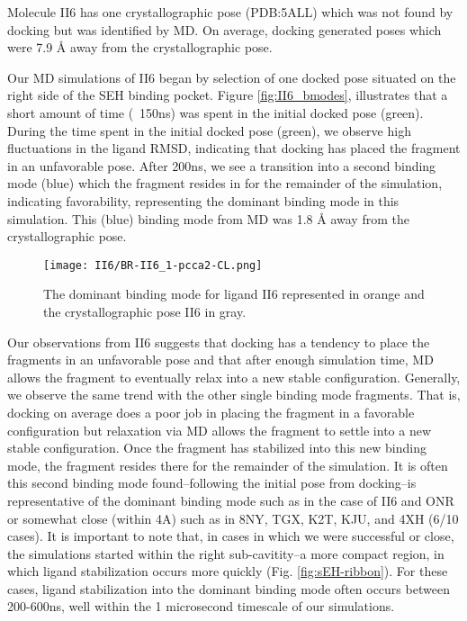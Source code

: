 \documentclass[journal=jcisd8,manuscript=article]{achemso}
\begin{document}
Molecule II6 has one crystallographic pose (PDB:5ALL) which was not found by docking but was identified by MD.
On average, docking generated poses which were 7.9 {\AA} away from the crystallographic pose.

Our MD simulations of II6 began by selection of one docked pose situated on the right side of the SEH binding pocket.
Figure \ref{fig:II6_bmodes}, illustrates that a short amount of time (~150ns) was spent in the initial docked pose (green).
During the time spent in the initial docked pose (green), we observe high fluctuations in the ligand RMSD, indicating that docking has placed the fragment in an unfavorable pose.
After 200ns, we see a transition into a second binding mode (blue) which the fragment resides in for the remainder of the simulation, indicating favorability, representing the dominant binding mode in this simulation.
This (blue) binding mode from MD was 1.8 {\AA} away from the crystallographic pose. 

\begin{figure}
    \centering
    \texttt{[image: II6/BR-II6\_1-pcca2-CL.png]}
    \caption[Ligand II6 with crystal structure]{The dominant binding mode for ligand II6 represented in orange and the crystallographic pose II6 in gray.}
    \label{fig:II6_pcca2}
\end{figure}

Our observations from II6 suggests that docking has a tendency to place the fragments in an unfavorable pose and that after enough simulation time, MD allows the fragment to eventually relax into a new stable configuration.
Generally, we observe the same trend with the other single binding mode fragments.
That is, docking on average does a poor job in placing the fragment in a favorable configuration but relaxation via MD allows the fragment to settle into a new stable configuration.
Once the fragment has stabilized into this new binding mode, the fragment resides there for the remainder of the simulation.
It is often this second binding mode found--following the initial pose from docking--is representative of the dominant binding mode such as in the case of II6 and ONR or somewhat close (within 4A) such as in 8NY, TGX, K2T, KJU, and 4XH (6/10 cases).
It is important to note that, in cases in which we were successful or close, the simulations started within the right sub-cavitity--a more compact region, in which ligand stabilization occurs more quickly (Fig. \ref{fig:sEH-ribbon}).
For these cases, ligand stabilization into the dominant binding mode often occurs between 200-600ns, well within the 1 microsecond timescale of our simulations.  
\end{document}
